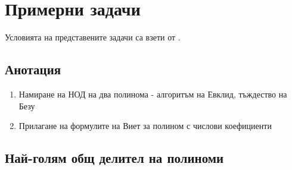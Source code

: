 \documentclass{../../common/topic}
\begin{document}
\section{Примерни задачи}

Условията на представените задачи са взети от \cite{PolynomialExercises}.

\subsection{Анотация}

\begin{enumerate}
  \item Намиране на НОД на два полинома - алгоритъм на Евклид, тъждество на Безу
  \item Прилагане на формулите на Виет за полином с числови коефициенти
\end{enumerate}

\subsection{Най-голям общ делител на полиноми}
\end{document}
